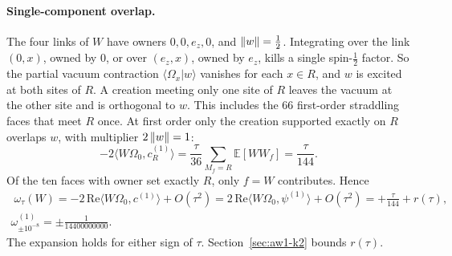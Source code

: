 \paragraph{Single-component overlap.}
The four links of $W$ have owners $0,0,e_z,0$, and $\left\lVert w\right\rVert=\tfrac12$.
Integrating over the link $(0,x)$, owned by $0$, or over $(e_z,x)$, owned by
$e_z$, kills a single spin-$\tfrac12$ factor. So the partial vacuum
contraction $\langle\Omega_x|w\rangle$ vanishes for each $x\in R$, and $w$ is
excited at both sites of $R$. A creation meeting only one site of $R$ leaves
the vacuum at the other site and is orthogonal to $w$. This includes the 66
first-order straddling faces that meet $R$ once. At first order only the
creation supported exactly on $R$ overlaps $w$, with multiplier
$2\left\lVert w\right\rVert=1$:
\begin{equation}
 -2\langle W\Omega_0,c^{(1)}_R\rangle
 =\frac{\tau}{36}\sum_{M_f=R}\mathbb E[WW_f]=\frac{\tau}{144}.
 \label{eq:aw1-overlap}
\end{equation}
Of the ten faces with owner set exactly $R$, only $f=W$ contributes. Hence
\begin{equation}
 \begin{gathered}
 \boxed{\;\omega_\tau(W)=-2\,\mathrm{Re}\langle W\Omega_0,c^{(1)}\rangle+O(\tau^2)
 =2\,\mathrm{Re}\langle W\Omega_0,\psi^{(1)}\rangle+O(\tau^2)
 =+\frac{\tau}{144}+r(\tau),\;}\\
 \omega^{(1)}_{\pm10^{-8}}=\pm\frac{1}{14400000000}.
 \end{gathered}
 \label{eq:aw1-mean}
\end{equation}
The expansion holds for either sign of $\tau$. Section~\ref{sec:aw1-k2}
bounds $r(\tau)$.

